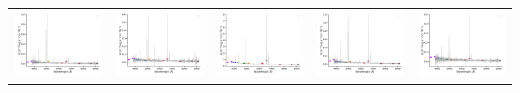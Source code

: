 \begin{center}
\begin{longtable}{l l l l l }
    \includegraphics[width=0.2\linewidth, clip]{Figs/Figs-sdss/spec-1494-52937-0249-STRIPE82-0013-010873.pdf} & \includegraphics[width=0.2\linewidth, clip]{Figs/Figs-sdss/spec-1509-52942-0633-STRIPE82-0058-020465.pdf} & \includegraphics[width=0.2\linewidth, clip]{Figs/Figs-sdss/spec-1511-52946-0192-STRIPE82-0059-038994.pdf} & \includegraphics[width=0.2\linewidth, clip]{Figs/Figs-sdss/spec-1512-53742-0281-STRIPE82-0061-012261.pdf} & \includegraphics[width=0.2\linewidth, clip]{Figs/Figs-sdss/spec-1512-53742-0296-STRIPE82-0061-011773.pdf} \\

\end{longtable}
\end{center}
